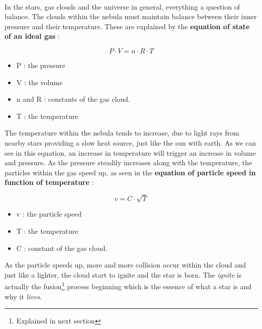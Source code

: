 \documentclass[a4paper, 11pt]{article} %
\begin{document}
\paragraph*{}
In the stars, gas clouds and the universe in general, everything  a question of balance. The clouds within the nebula must maintain balance between their inner pressure and their temperature. These are explained by the \textbf{equation of state of an ideal gas} : 
\label{GP}
\begin{multicols}{2}

\begin{equation}
P\cdot V = n \cdot R \cdot T
\end{equation}
\vspace{2cm}
\begin{itemize}
\item P : the pressure
\item V : the volume
\item n and R : constants of the gas cloud.
\item T : the temperature 
\end{itemize}
\end{multicols}

The temperature within the nebula tends to increase, due to light rays from nearby stars providing a slow heat source, just like the sun with earth. As we can see in this equation, an increase in temperature will trigger an increase in volume and pressure. As the pressure steadily increases along with the temperature, the particles within the gas speed up, as seen in the \textbf{equation of particle speed in function of temperature} :

\begin{multicols}{2}

\begin{equation}
v = C \cdot \sqrt{T}
\end{equation}
\vspace{2cm}
\begin{itemize}
\item v : the particle speed
\item T : the temperature
\item C : constant of the gas cloud. 
\end{itemize}
\end{multicols}

As the particle speeds up, more and more collision occur within the cloud and just like a lighter, the cloud start to ignite and the star is born. The \textit{ignite} is actually the fusion\footnote{Explained in next section} process beginning which is the essence of what a star is and why it \textit{lives}.
\end{document}
